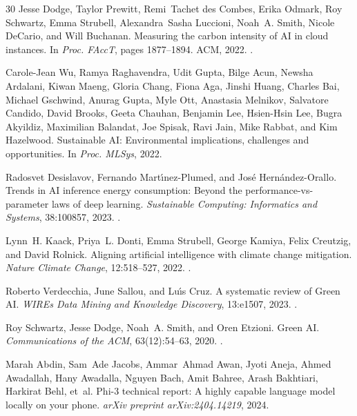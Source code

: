 \documentclass[acmlarge,manuscript,screen,review]{acmart}
\begin{document}
\begin{thebibliography}{30}
Jesse Dodge, Taylor Prewitt, Remi~Tachet des Combes, Erika Odmark, Roy Schwartz, Emma Strubell, Alexandra~Sasha Luccioni, Noah~A. Smith, Nicole DeCario, and Will Buchanan.
\newblock Measuring the carbon intensity of {AI} in cloud instances.
\newblock In \emph{Proc. FAccT}, pages 1877--1894. ACM, 2022.
\newblock {}.

Carole-Jean Wu, Ramya Raghavendra, Udit Gupta, Bilge Acun, Newsha Ardalani, Kiwan Maeng, Gloria Chang, Fiona Aga, Jinshi Huang, Charles Bai, Michael Gschwind, Anurag Gupta, Myle Ott, Anastasia Melnikov, Salvatore Candido, David Brooks, Geeta Chauhan, Benjamin Lee, Hsien-Hsin Lee, Bugra Akyildiz, Maximilian Balandat, Joe Spisak, Ravi Jain, Mike Rabbat, and Kim Hazelwood.
\newblock Sustainable {AI}: Environmental implications, challenges and opportunities.
\newblock In \emph{Proc. MLSys}, 2022.

Radosvet Desislavov, Fernando Mart{\'\i}nez-Plumed, and Jos{\'e} Hern{\'a}ndez-Orallo.
\newblock Trends in {AI} inference energy consumption: Beyond the performance-vs-parameter laws of deep learning.
\newblock \emph{Sustainable Computing: Informatics and Systems}, 38:100857, 2023.
\newblock {}.

Lynn~H. Kaack, Priya~L. Donti, Emma Strubell, George Kamiya, Felix Creutzig, and David Rolnick.
\newblock Aligning artificial intelligence with climate change mitigation.
\newblock \emph{Nature Climate Change}, 12:518--527, 2022.
\newblock {}.

Roberto Verdecchia, June Sallou, and Lu{\'\i}s Cruz.
\newblock A systematic review of {Green AI}.
\newblock \emph{WIREs Data Mining and Knowledge Discovery}, 13:e1507, 2023.
\newblock {}.

Roy Schwartz, Jesse Dodge, Noah~A. Smith, and Oren Etzioni.
\newblock Green {AI}.
\newblock \emph{Communications of the ACM}, 63(12):54--63, 2020.
\newblock {}.

Marah Abdin, Sam~Ade Jacobs, Ammar~Ahmad Awan, Jyoti Aneja, Ahmed Awadallah, Hany Awadalla, Nguyen Bach, Amit Bahree, Arash Bakhtiari, Harkirat Behl, et~al.
\newblock Phi-3 technical report: A highly capable language model locally on your phone.
\newblock \emph{arXiv preprint arXiv:2404.14219}, 2024.


\end{thebibliography}
\end{document}

